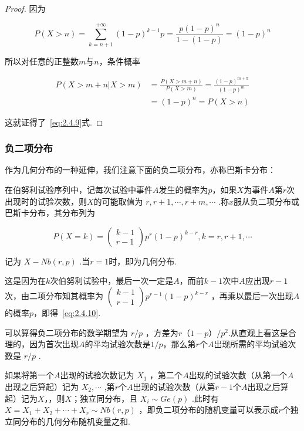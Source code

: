 \begin{proof}
	因为
	
	\[
	P(X>n)=\sum_{k=n+1}^{+\infty}(1-p)^{k-1} p=\frac{p(1-p)^{n}}{1-(1-p)}=(1-p)^{n}
	\]
	
	所以对任意的正整数$ m $与$ n $，条件概率
	
	\[
	\begin{aligned} P(X>m+n | X>m) &=\frac{P(X>m+n)}{P(X>m)}=\frac{(1-p)^{m+\pi}}{(1-p)^{m}} \\ &=(1-p)^{n}=P(X>n) \end{aligned}
	\]
	
	这就证得了~\ref{eq:2.4.9}式.
\end{proof}

\subsubsection{负二项分布}

作为几何分布的一种延伸，我们注意下面的负二项分布，亦称巴斯卡分布：

在伯努利试验序列中，记每次试验中事件$ A $发生的概率为$ p $，如果$ X $为事件$ A $第$ r $次出现时的试验次数，则$ X $的可能取值为 $r, r+1, \cdots, r+m, \cdots$ .称$ x $服从负二项分布或巴斯卡分布，其分布列为

\begin{equation}
P(X=k)=\left( \begin{array}{l}{k-1} \\ {r-1}\end{array}\right) p^{r}(1-p)^{k-r}, k=r, r+1, \cdots \label{eq:2.4.10}
\end{equation}

记为 $X-N b(r, p)$ .当$ r=1 $时，即为几何分布.

这是因为在$ k $次伯努利试验中，最后一次一定是$ A $，而前$ k-1 $次中$ A $应出现$ r-1 $次，由二项分布知其概率为 $\left( \begin{array}{l}{k-1} \\ {r-1}\end{array}\right) p^{r-1}(1-p)^{k-r}$ ，再乘以最后一次出现$ A $的概率$ p $，即得~\ref{eq:2.4.10}.

可以算得负二项分布的数学期望为 $r / p$ ，方差为$ r（1-p）/p^{2} $.从直观上看这是合理的，因为首次出现$ A $的平均试验次数是$ 1/p $，那么第$ r $个$ A $出现所需的平均试验次数是 $r / p$ .

如果将第一个$ A $出现的试验次数记为 $X_{1}$ ，第二个$ A $出现的试验次数（从第一个$ A $出现之后算起）记为 $X_{2}, \cdots$ ,第$ r $个$ A $出现的试验次数（从第$ r-1 $个$ A $出现之后算起）记为$ X $，，则$ X $；独立同分布，且 $X_{i} \sim G e(p)$ .此时有$ X=X_{1}+ X_{2}+\cdots+X_{r} \sim N b(r, p) $ ，即负二项分布的随机变量可以表示成$ r $个独立同分布的几何分布随机变量之和.

